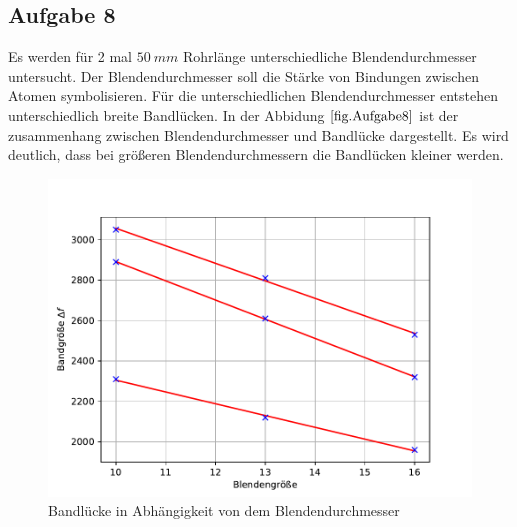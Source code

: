\subsection{Aufgabe 8}
Es werden für 2 mal $\SI{50}{mm}$ Rohrlänge unterschiedliche Blendendurchmesser untersucht. Der Blendendurchmesser soll die Stärke von Bindungen zwischen Atomen symbolisieren.
Für die unterschiedlichen Blendendurchmesser entstehen unterschiedlich breite Bandlücken.
In der Abbidung $\ref{fig.Aufgabe8}$ ist der zusammenhang zwischen Blendendurchmesser und Bandlücke dargestellt.
Es wird deutlich, dass bei größeren Blendendurchmessern die Bandlücken kleiner werden.
\begin{figure}[h!]
  \centering
  \includegraphics[width=\textwidth]{A8.pdf}
  \caption{Bandlücke in Abhängigkeit von dem Blendendurchmesser}
  \label{fig.Aufgabe8}
\end{figure}
\FloatBarrier

